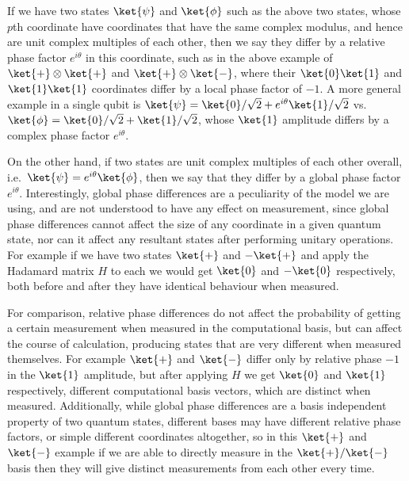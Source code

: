 If we have two states $\ket{\psi}$ and $\ket{\phi}$ such as the above two states, whose $p$th coordinate have coordinates that have the same complex modulus, and hence are unit complex multiples of each other, then we say they differ by a relative phase factor $e^{i\theta}$ in this coordinate, such as in the above example of $\ket{+}\otimes \ket{+}$ and $\ket{+}\otimes \ket{-}$, where their $\ket{0}\ket{1}$ and $\ket{1}\ket{1}$ coordinates differ by a local phase factor of $-1$. A more general example in a single qubit is $\ket{\psi} = \ket{0}/\sqrt{2} + e^{i\theta}\ket{1}/\sqrt{2}$ vs. $\ket{\phi} = \ket{0}/\sqrt{2} + \ket{1}/\sqrt{2}$, whose $\ket{1}$ amplitude differs by a complex phase factor $e^{i\theta}$.

On the other hand, if two states are unit complex multiples of each other overall, i.e.\ $\ket{\psi} = e^{i\theta}\ket{\phi}$, then we say that they differ by a global phase factor $e^{i\theta}$. Interestingly, global phase differences are a peculiarity of the model we are using, and are not understood to have any effect on measurement, since global phase differences cannot affect the size of any coordinate in a given quantum state, nor can it affect any resultant states after performing unitary operations. For example if we have two states $\ket{+}$ and $-\ket{+}$ and apply the Hadamard matrix $H$ to each we would get $\ket{0}$ and $-\ket{0}$ respectively, both before and after they have identical behaviour when measured.

For comparison, relative phase differences do not affect the probability of getting a certain measurement when measured in the computational basis, but can affect the course of calculation, producing states that are very different when measured themselves. For example $\ket{+}$ and $\ket{-}$ differ only by relative phase $-1$ in the $\ket{1}$ amplitude, but after applying $H$ we get $\ket{0}$ and $\ket{1}$ respectively, different computational basis vectors, which are distinct when measured. Additionally, while global phase differences are a basis independent property of two quantum states, different bases may have different relative phase factors, or simple different coordinates altogether, so in this $\ket{+}$ and $\ket{-}$ example if we are able to directly measure in the $\ket{+}/\ket{-}$ basis then they will give distinct measurements from each other every time.


